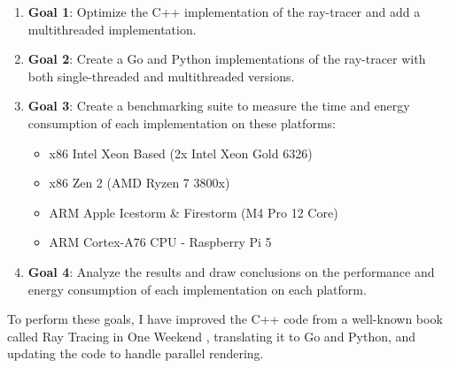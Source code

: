 \begin{enumerate}
    \item \textbf{Goal 1}: Optimize the C++ implementation of the ray-tracer and add a multithreaded implementation.
    \item \textbf{Goal 2}: Create a Go and Python implementations of the ray-tracer with both single-threaded and multithreaded versions.
    \item \textbf{Goal 3}: Create a benchmarking suite to measure the time and energy consumption of each implementation on these platforms:
    \begin{itemize}
        \item x86 Intel Xeon Based (2x Intel Xeon Gold 6326)
        \item x86 Zen 2 (AMD Ryzen 7 3800x)
        \item ARM Apple Icestorm \& Firestorm (M4 Pro 12 Core)
        \item ARM Cortex-A76 CPU - Raspberry Pi 5
    \end{itemize}   
    \item \textbf{Goal 4}: Analyze the results and draw conclusions on the performance and energy consumption of each implementation on each platform.
\end{enumerate}

To perform these goals, I have improved the C++ code from a well-known book called Ray Tracing in One Weekend
\cite{Shirley2016RTW1}, translating it to Go and Python, and updating the code to handle parallel rendering. 


\label{list:platforms}

